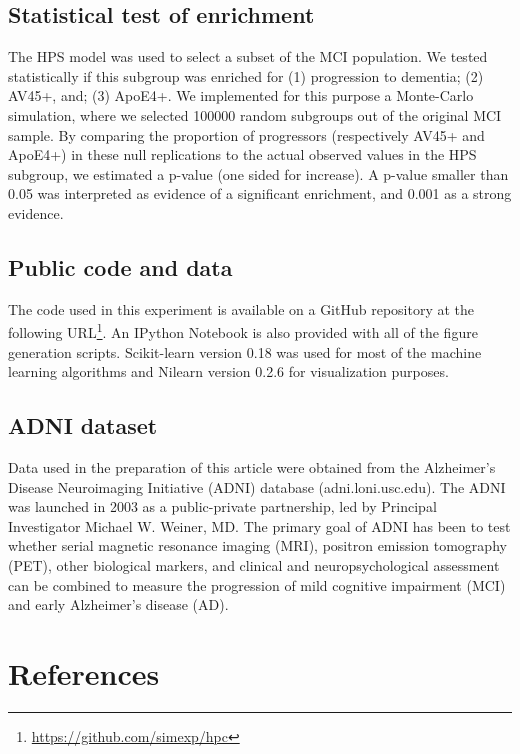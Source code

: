 \documentclass[authoryear]{elsarticle}
\begin{document}
\subsection*{Statistical test of enrichment }
The HPS model was used to select a subset of the MCI population. We tested statistically if this subgroup was enriched for (1) progression to dementia; (2) AV45+, and; (3) ApoE4+. We implemented for this purpose a Monte-Carlo simulation, where we selected 100000 random subgroups out of the original MCI sample. By comparing the proportion of progressors (respectively AV45+ and ApoE4+) in these null replications to the actual observed values in the HPS subgroup, we estimated a p-value \citep{Phipson2010} (one sided for increase). A p-value smaller than 0.05 was interpreted as evidence of a significant enrichment, and 0.001 as a strong evidence.
\subsection*{Public code and data}
The code used in this experiment is available on a 
GitHub repository at the following URL\footnote{\url{https://github.com/simexp/hpc}}. An IPython Notebook is also provided with all of the figure generation scripts. Scikit-learn \cite{scikit-learn} version 0.18 was used for most of the machine learning algorithms and Nilearn \cite{Abraham2014} version 0.2.6 for visualization purposes. 


\subsection*{ADNI dataset}
Data used in the preparation of this article were obtained from the Alzheimer's Disease Neuroimaging Initiative (ADNI) database (adni.loni.usc.edu). The ADNI was launched in 2003 as a public-private partnership, led by Principal Investigator Michael W. Weiner, MD. The primary goal of ADNI has been to test whether serial magnetic resonance imaging (MRI), positron emission tomography (PET), other biological markers, and clinical and neuropsychological assessment can be combined to measure the progression of mild cognitive impairment (MCI) and early Alzheimer's disease (AD).


\section*{References}



\end{document}
